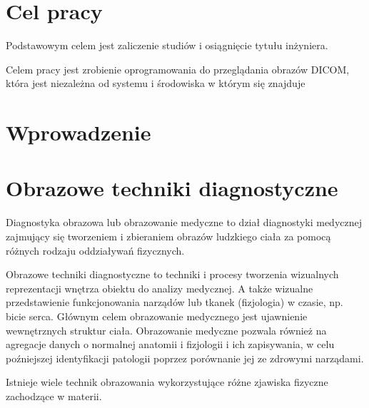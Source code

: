 
\section{Cel pracy}

Podstawowym celem jest zaliczenie studiów i osiągnięcie tytułu inżyniera.

Celem pracy jest zrobienie oprogramowania do przeglądania obrazów DICOM, która jest niezależna od systemu i środowiska w którym się znajduje

\section{Wprowadzenie}

\section{Obrazowe techniki diagnostyczne}

Diagnostyka obrazowa lub obrazowanie medyczne to dział diagnostyki medycznej zajmujący się tworzeniem i zbieraniem obrazów ludzkiego ciała za pomocą różnych rodzaju oddziaływań fizycznych.

Obrazowe techniki diagnostyczne to techniki i procesy tworzenia wizualnych reprezentacji wnętrza obiektu do analizy medycznej.
A także wizualne przedstawienie funkcjonowania narządów lub tkanek (fizjologia) w czasie, np. bicie serca.
Głównym celem obrazowanie medycznego jest ujawnienie wewnętrznych struktur ciała.
Obrazowanie medyczne pozwala również na agregacje danych o normalnej anatomii i fizjologii i ich zapisywania, w celu poźniejszej identyfikacji patologii poprzez porównanie jej ze zdrowymi narządami.

Istnieje wiele technik obrazowania wykorzystujące różne zjawiska fizyczne zachodzące w materii.

